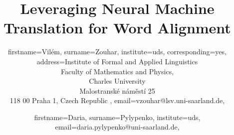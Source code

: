 \documentclass{pbml}
\begin{document}

\title{Leveraging Neural Machine Translation for Word Alignment}




\author{
  firstname=Vilém,
  surname=Zouhar,
  institute={uds},
  corresponding=yes,
  address={Institute of Formal and Applied Linguistics\\
    Faculty of Mathematics and Physics,\\
    Charles University\\
    Malostranské náměstí 25\\
    118 00 Praha 1, Czech Republic
  },
  email={vzouhar@lsv.uni-saarland.de},
}

\author{
  firstname=Daria,
  surname=Pylypenko,
  institute={uds},
  email={daria.pylypenko@uni-saarland.de},
}



\PBMLmaketitle
\end{document}
